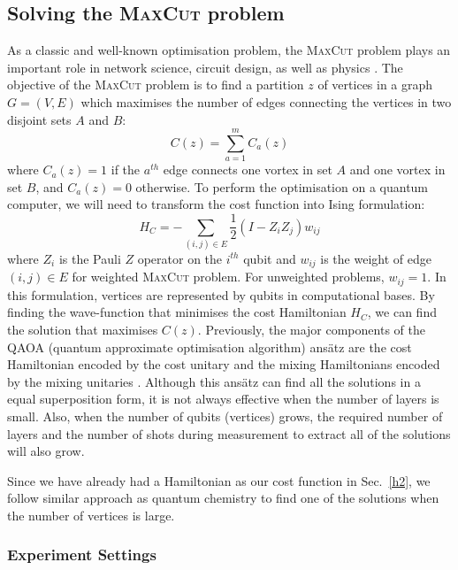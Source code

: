 \documentclass[a4paper,onecolumn,11pt]{quantumarticle}
\begin{document}
\subsection{Solving the \textsc{MaxCut} problem}
As a classic and well-known optimisation problem, the \textsc{MaxCut} problem plays an important role in network science, circuit design, as well as physics \cite{Bharti2022-sw}. The objective of the \textsc{MaxCut} problem is to find a partition $z$ of vertices in a graph $G = (V, E)$ which maximises the number of edges connecting the vertices in two disjoint sets $A$ and $B$:
\begin{equation}
    C(z) =\sum_{a=1}^m C_a(z)
\end{equation}
where $C_a(z) = 1$ if the $a^{th}$ edge connects one vortex in set $A$ and one vortex in set $B$, and $C_a(z) = 0$ otherwise. To perform the optimisation on a quantum computer, we will need to transform the cost function into Ising formulation:
\begin{equation}
    H_C = -\sum_{(i, j)\in E} \frac{1}{2} (I - Z_i Z_j)w_{ij}
\end{equation}\label{qaoa_ham}
where $Z_i$ is the Pauli $Z$ operator on the $i^{th}$ qubit and $w_{ij}$ is the weight of edge $(i, j)\in E$ for weighted \textsc{MaxCut} problem. For unweighted problems, $w_{ij} = 1$. In this formulation, vertices are represented by qubits in computational bases. By finding the wave-function that minimises the cost Hamiltonian $H_C$, we can find the solution that maximises $C(z)$. Previously, the major components of the QAOA (quantum approximate optimisation algorithm) ans\"atz are the cost Hamiltonian encoded by the cost unitary and the mixing Hamiltonians encoded by the mixing unitaries \cite{Farhi2014-ug}. Although this ans\"atz can find all the solutions in a equal superposition form, it is not always effective when the number of layers is small. Also, when the number of qubits (vertices) grows, the required number of layers and the number of shots during measurement to extract all of the solutions will also grow.

Since we have already had a Hamiltonian as our cost function in Sec.~\ref{h2}, we follow similar approach as quantum chemistry to find one of the solutions when the number of vertices is large.

\subsubsection{Experiment Settings}
\end{document}
